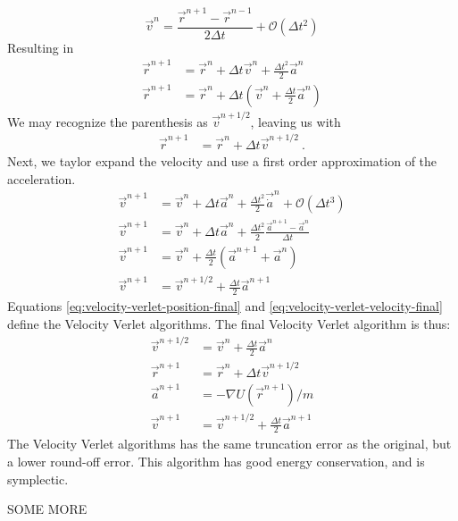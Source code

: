 \documentclass[twoside,english]{uiofysmaster}
\newcommand\lr[1]{\left(#1\right)}
\begin{document}
 \begin{equation}\label{eq:velocity-verlet-velocity}
\vec{v}^n = \frac{ \vec{r}^{n+1}-\vec{r}^{n-1} }{2\Delta t} + \mathcal{O}(\Delta t^2)
\end{equation}
Resulting in 
\begin{align}\label{eq:velocity-verlet}
	\vec{r}^{n+1} &= \vec{r}^n + \Delta t\vec{v}^n + \frac{\Delta t^2}{2}\vec{a}^n\\
	\vec{r}^{n+1} &= \vec{r}^n + \Delta t\lr{\vec{v}^n + \frac{\Delta t}{2}\vec{a}^n}	
\end{align}    
We may recognize the parenthesis as $\vec{v}^{n+1/2}$, leaving us with
\begin{align}
\vec{r}^{n+1} &= \vec{r}^n + \Delta t \vec{v}^{n+1/2}~. \label{eq:velocity-verlet-position-final}
\end{align}  
Next, we taylor expand the velocity and use a first order approximation of the acceleration.
\begin{align}
\vec{v}^{n+1} &= \vec{v}^n + \Delta t \vec{a}^{n} +  \frac{\Delta t^2}{2}\vec{\dot{a}}^n + \mathcal{O}(\Delta t^3)\\
\vec{v}^{n+1} &= \vec{v}^n + \Delta t \vec{a}^{n} +  \frac{\Delta t^2}{2}\frac{\vec{a}^{n+1} - \vec{a}^n}{\Delta t} \\
\vec{v}^{n+1} &= \vec{v}^n + \frac{\Delta t}{2} \lr{\vec{a}^{n+1} + \vec{a}^n} \\
\vec{v}^{n+1} &= \vec{v}^{n+1/2} + \frac{\Delta t}{2} \vec{a}^{n+1} \label{eq:velocity-verlet-velocity-final}
\end{align}
Equations \eqref{eq:velocity-verlet-position-final} and \eqref{eq:velocity-verlet-velocity-final} define the Velocity Verlet algorithms. 
The final Velocity Verlet algorithm is thus:
\savebox{}
\begin{align}
\vec{v}^{n+1/2}	 &= \vec{v}^{n} +  \frac{\Delta t}{2}\vec{a}^n\\
\vec{r}^{n+1} &= \vec{r}^n + \Delta t \vec{v}^{n+1/2}	\\
\vec{a}^{n+1} &= -\nabla U(\vec{r}^{n+1})/m\\
\vec{v}^{n+1} &= \vec{v}^{n+1/2} + \frac{\Delta t}{2} \vec{a}^{n+1}
\end{align}
The Velocity Verlet algorithms has the same truncation error as the original, but a lower round-off error. 
This algorithm has good energy conservation, and is symplectic.

SOME MORE
\end{document}
